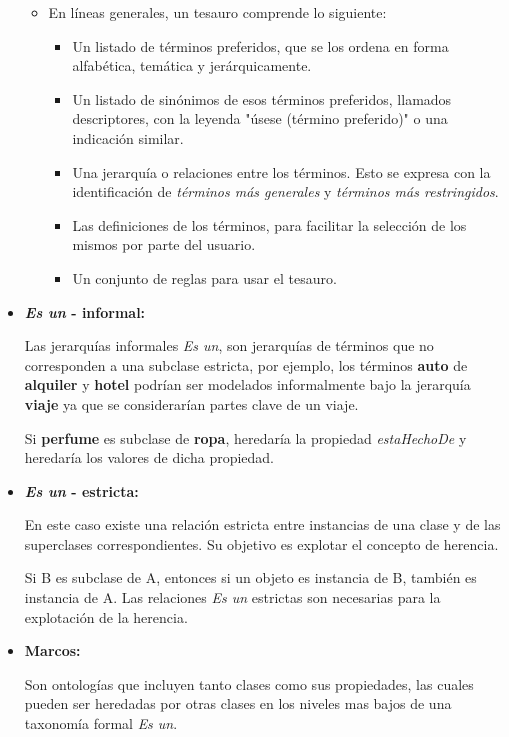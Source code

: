 \documentclass[a4paper,12pt,twoside,final,spanish]{article}
\begin{document}
\begin{itemize}
\begin{itemize}
\item En líneas generales, un tesauro comprende lo siguiente:
	\begin{itemize}
	\item Un listado de términos preferidos, que se los ordena en forma alfabética, 
	temática y jerárquicamente.	
	\item Un listado de sinónimos de esos términos preferidos, llamados descriptores, 		con la leyenda "úsese (término preferido)" o una indicación similar.
	\item Una jerarquía o relaciones entre los términos. Esto se expresa con la 			identificación de \textit{términos más generales} y \textit{términos más 				restringidos}.
	\item Las definiciones de los términos, para facilitar la selección de los mismos 		por parte del usuario.
	\item Un conjunto de reglas para usar el tesauro.
	\end{itemize}
\end{itemize}

\item \textbf{\textit{Es un} - informal:}

Las jerarquías informales \textit{Es un}, son jerarquías de términos que no corresponden a una subclase estricta, por ejemplo, los términos \textbf{auto} de \textbf{alquiler} y \textbf{hotel} podrían ser modelados informalmente bajo la jerarquía \textbf{viaje} ya que se considerarían partes clave de un viaje.

Si \textbf{perfume} es subclase de \textbf{ropa}, heredaría la propiedad \textit{estaHechoDe} y heredaría los valores de dicha propiedad.

\item \textbf{\textit{Es un} - estricta:}

En este caso existe una relación estricta entre instancias de una clase y de las superclases correspondientes. Su objetivo es explotar el concepto de herencia.

Si B es subclase de A, entonces si un objeto es instancia de B, también es instancia de A. Las relaciones \textit{Es un} estrictas son necesarias para la explotación de la herencia.

\item \textbf{Marcos:}

Son ontologías que incluyen tanto clases como sus propiedades, las cuales pueden ser heredadas por otras clases en los niveles mas bajos de una taxonomía formal \textit{Es un}.


\end{itemize}
\end{document}
